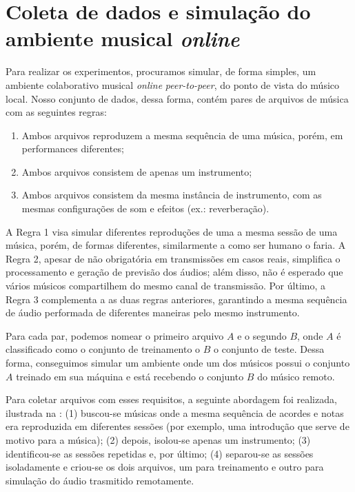 \section{Coleta de dados e simulação do ambiente musical \textit{online}}
\label{sec:data_gathering}

Para realizar os experimentos, procuramos simular, de forma simples, um ambiente colaborativo musical \textit{online} \textit{peer-to-peer}, do ponto de vista do músico local. Nosso conjunto de dados, dessa forma, contém pares de arquivos de música com as seguintes regras:

\begin{enumerate}
    \item Ambos arquivos reproduzem a mesma sequência de uma música, porém, em performances diferentes;
    \item Ambos arquivos consistem de apenas um instrumento;
    \item Ambos arquivos consistem da mesma instância de instrumento, com as mesmas configurações de som e efeitos (ex.: reverberação).
\end{enumerate}

A Regra 1 visa simular diferentes reproduções de uma a mesma sessão de uma música, porém, de formas diferentes, similarmente a como ser humano o faria. A Regra 2, apesar de não obrigatória em transmissões em casos reais, simplifica o processamento e geração de previsão dos áudios; além disso, não é esperado que vários músicos compartilhem do mesmo canal de transmissão. Por último, a Regra 3 complementa a as duas regras anteriores, garantindo a mesma sequência de áudio performada de diferentes maneiras pelo mesmo instrumento.

Para cada par, podemos nomear o primeiro arquivo $A$ e o segundo $B$, onde $A$ é classificado como o conjunto de treinamento o $B$ o conjunto de teste. Dessa forma, conseguimos simular um ambiente onde um dos músicos possui o conjunto $A$ treinado em sua máquina e está recebendo o conjunto $B$ do músico remoto.

Para coletar arquivos com esses requisitos, a seguinte abordagem foi realizada, ilustrada na : (1) buscou-se músicas onde a mesma sequência de acordes e notas era reproduzida em diferentes sessões (por exemplo, uma introdução que serve de motivo para a música); (2) depois, isolou-se apenas um instrumento; (3) identificou-se as sessões repetidas e, por último; (4) separou-se as sessões isoladamente e criou-se os dois arquivos, um para treinamento e outro para simulação do áudio trasmitido remotamente.

